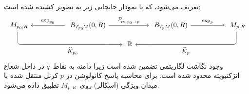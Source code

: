 تعریف می‌شود، که با نمودار جابجایی زیر به تصویر کشیده شده است:
\begin{equation}\label{cd:PTC_kernel_1}
\begin{tikzcd}[column sep=50, row sep=10, font=\normalsize]
    M_{p_0,R}
        \arrow[drr, rounded corners, to path={ 
            |-node[below, pos=.8]{\small$\widehat{K}_{p_0}$} ([xshift=-5.ex]\tikztotarget.west) 
            -- (\tikztotarget.west)
            }]
    & B_{T_{\mkern-1.mu p_0}\!M}(0,R)
        \arrow[l, "\exp_{p_0}"']
        \arrow[rr, "\mathcal{P}_{\mkern-2mu\overset{}{\protect\scalebox{.6}{$\!T\!M$}\mkern-2mu,\mkern1mu p_0\to p}}"]
    &[-30pt]
    &[-30pt]
      B_{\TpM}(0,R)
        \arrow[r, "\exp_p"]
    & M_{p,R}
        \arrow[dll, rounded corners, to path={ 
            |-node[below, pos=.8]{\small$\widehat{K}_p$} ([xshift=5.ex]\tikztotarget.east) 
            -- (\tikztotarget.east)
            }]
    \\
    & & \R
\end{tikzcd}
\end{equation}
وجود نگاشت لگاریتمی تضمین شده است زیرا دامنه به نقاط~$q$ در داخل شعاع انژکتیویته محدود شده است.
برای محاسبه پاسخ کانولوشن در $p$ کرنل منتقل شده با میدان ویژگی (اسکالر) روی~$M_{p,R}$ تطبیق داده می‌شود.


